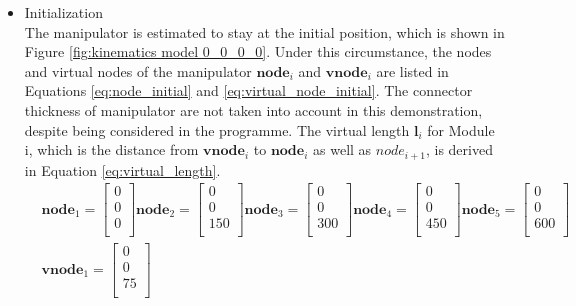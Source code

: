 \begin{itemize}
    \item Initialization \\
    The manipulator is estimated to stay at the initial position, which is shown in Figure 
    \ref{fig:kinematics model 0_0_0_0}. Under this circumstance, the nodes and virtual nodes of the manipulator 
    $\textbf{node}_{i}$ and $\textbf{vnode}_{i}$ are listed in Equations \ref{eq:node_initial} and 
    \ref{eq:virtual_node_initial}. The connector thickness of manipulator are not taken into account in this 
    demonstration, despite being considered in the programme. The virtual length $\textbf{l}_{i}$ for Module i, which 
    is the distance from $\textbf{vnode}_{i}$ to $\textbf{node}_{i}$ as well as ${node}_{i+1}$, is derived in Equation 
    \ref{eq:virtual_length}.
    \begin{align}
        & \textbf{node}_{1} = \begin{bmatrix} 0 \\ 0 \\ 0 \\ \end{bmatrix} 
        \textbf{node}_{2} = \begin{bmatrix} 0 \\ 0 \\ 150 \\ \end{bmatrix} 
        \textbf{node}_{3} = \begin{bmatrix} 0 \\ 0 \\ 300 \\ \end{bmatrix} 
        \textbf{node}_{4} = \begin{bmatrix} 0 \\ 0 \\ 450 \\ \end{bmatrix} 
        \textbf{node}_{5} = \begin{bmatrix} 0 \\ 0 \\ 600 \\ \end{bmatrix} 
        \label{eq:node_initial} \\
        &\textbf{vnode}_{1} = \begin{bmatrix} 0 \\ 0 \\ 75 \\ \end{bmatrix} 

\end{align}
\end{itemize}
